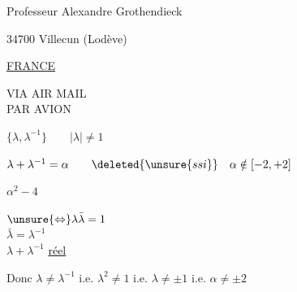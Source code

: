 Professeur Alexandre Grothendieck

34700 Villecun (Lodève)

\uline{FRANCE}

VIA AIR MAIL\\
PAR AVION



$\{\lambda,\lambda^{-1}\}\qquad |\lambda|\ne1$

$\lambda+\lambda^{-1}=\alpha\qquad\deleted{\unsure{ssi}}\quad\alpha\notin[-2,+2]$

$\alpha^2-4$

$\unsure{\Leftrightarrow}\lambda\bar\lambda=1$\\
$\bar\lambda=\lambda^{-1}$\\
$\lambda+\lambda^{-1}$ \uline{réel}

Donc $\lambda\ne\lambda^{-1}$ i.e. $\lambda^2\ne1$ i.e. $\lambda\ne\pm1$ i.e. $\alpha\ne\pm2$
